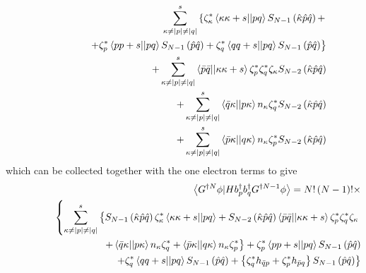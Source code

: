 \documentclass{article}
\begin{document}
\begin{eqnarray}
&&\sum_{\kappa \neq \left| p\right| \neq \left| q\right| }^{s}\left\{ \zeta
_{\kappa }^{\ast }\left\langle \kappa \kappa +s||pq\right\rangle
S_{N-1}\left( \hat{\kappa}\hat{p}\hat{q}\right) +\right.  \notag \\
&&\qquad \qquad \left. +\zeta _{p}^{\ast }\left\langle pp+s||pq\right\rangle
S_{N-1}\left( \hat{p}\hat{q}\right) +\zeta _{q}^{\ast }\left\langle
qq+s||pq\right\rangle S_{N-1}\left( \hat{p}\hat{q}\right) \right\}  \notag \\
&&\qquad \qquad +\sum_{\kappa \neq \left| p\right| \neq \left| q\right|
}^{s}\left\langle \bar{p}\bar{q}||\kappa \kappa +s\right\rangle \zeta
_{p}^{\ast }\zeta _{q}^{\ast }\zeta _{\kappa }S_{N-2}\left( \hat{\kappa}\hat{%
p}\hat{q}\right)  \notag \\
&&\qquad \qquad +\sum_{\kappa \neq \left| p\right| \neq \left| q\right|
}^{s}\left\langle \bar{q}\kappa ||p\kappa \right\rangle n_{\kappa }\zeta
_{q}^{\ast }S_{N-2}\left( \hat{\kappa}\hat{p}\hat{q}\right)  \notag \\
&&\qquad \qquad +\sum_{\kappa \neq \left| p\right| \neq \left| q\right|
}^{s}\left\langle \bar{p}\kappa ||q\kappa \right\rangle n_{\kappa }\zeta
_{p}^{\ast }S_{N-2}\left( \hat{\kappa}\hat{p}\hat{q}\right)
\end{eqnarray}%
which can be collected together with the one electron terms to give 
\begin{eqnarray}
&&\left\langle G^{\dagger N}\phi |Hb_{p}^{\dagger }b_{q}^{\dagger
}G^{\dagger N-1}\phi \right\rangle =N!\left( N-1\right) !\times  \notag \\
&&\left\{ \sum_{\kappa \neq \left| p\right| \neq \left| q\right|
}^{s}\left\{ S_{N-1}\left( \hat{\kappa}\hat{p}\hat{q}\right) \zeta _{\kappa
}^{\ast }\left\langle \kappa \kappa +s||pq\right\rangle +S_{N-2}\left( \hat{%
\kappa}\hat{p}\hat{q}\right) \left\langle \bar{p}\bar{q}||\kappa \kappa
+s\right\rangle \zeta _{p}^{\ast }\zeta _{q}^{\ast }\zeta _{\kappa }\right.
\right.  \notag \\
&&\quad \quad \quad \quad \quad \quad \quad \quad \quad \left. +\left\langle 
\bar{q}\kappa ||p\kappa \right\rangle n_{\kappa }\zeta _{q}^{\ast
}+\left\langle \bar{p}\kappa ||q\kappa \right\rangle n_{\kappa }\zeta
_{p}^{\ast }\right\} +\zeta _{p}^{\ast }\left\langle pp+s||pq\right\rangle
S_{N-1}\left( \hat{p}\hat{q}\right)  \notag \\
&&\quad \quad \quad \quad \quad \quad \quad \quad \quad \quad \left. +\zeta
_{q}^{\ast }\left\langle qq+s||pq\right\rangle S_{N-1}\left( \hat{p}\hat{q}%
\right) +\left\{ \zeta _{q}^{\ast }h_{\bar{q}p}+\zeta _{p}^{\ast }h_{\bar{p}%
q}\right\} S_{N-1}\left( \hat{p}\hat{q}\right) \right\}
\end{eqnarray}
\end{document}
